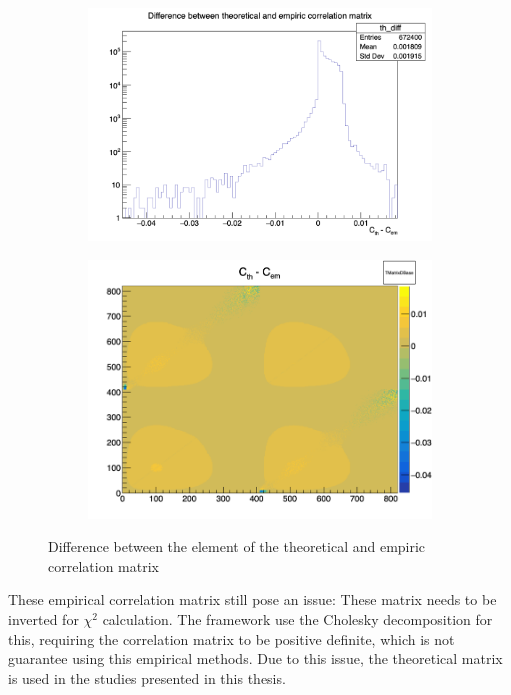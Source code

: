 \documentclass[../main.tex]{subfiles}
\begin{document}
\begin{figure}[ht]
  \centering
  \begin{subfigure}[t]{0.49\linewidth}
    \includegraphics[width=\linewidth]{images/joint_fit/th_em_corr_diff.png}
    \caption{}
    \label{fig:joint_fit:th_em_diff}
  \end{subfigure}
  \begin{subfigure}[t]{0.49\linewidth}
    \includegraphics[width=\linewidth]{images/joint_fit/th_em_corr_diff_mat.png}
    \caption{}
    \label{fig:joint_fit:th_em_diff_mat}
  \end{subfigure}
  \caption{Difference between the element of the theoretical and empiric correlation matrix}
\end{figure}

These empirical correlation matrix still pose an issue: These matrix needs to be inverted for $\chi^2$ calculation. The framework use the Cholesky decomposition \cite{noauthor_note_1924} for this, requiring the correlation matrix to be positive definite, which is not guarantee using this empirical methods. Due to this issue, the theoretical matrix is used in the studies presented in this thesis.
\end{document}
